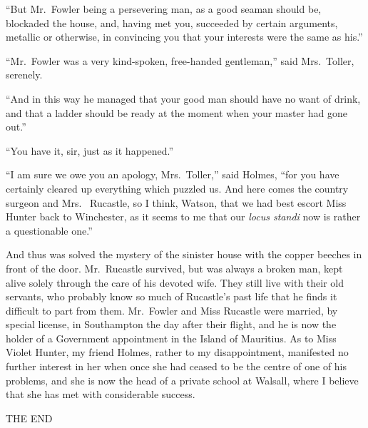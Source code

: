“But Mr.~Fowler being a persevering man, as a good
seaman should be, blockaded the house, and, having met you,
succeeded by certain arguments, metallic or otherwise, in
convincing you that your interests were the same as his.”

“Mr.~Fowler was a very kind-spoken, free-handed gentleman,”
said Mrs.~Toller, serenely.

“And in this way he managed that your good man should
have no want of drink, and that a ladder should be ready at
the moment when your master had gone out.”

“You have it, sir, just as it happened.”

“I am sure we owe you an apology, Mrs.~Toller,” said
Holmes, “for you have certainly cleared up everything which
puzzled us. And here comes the country surgeon and Mrs.\ %
Rucastle, so I think, Watson, that we had best escort Miss
Hunter back to Winchester, as it seems to me that our \textit{locus
standi} now is rather a questionable one.”

And thus was solved the mystery of the sinister house with
the copper beeches in front of the door. Mr.~Rucastle survived,
but was always a broken man, kept alive solely through
the care of his devoted wife. They still live with their old
servants, who probably know so much of Rucastle’s past life
that he finds it difficult to part from them. Mr.~Fowler and
Miss Rucastle were married, by special license, in Southampton
the day after their flight, and he is now the holder of a
Government appointment in the Island of Mauritius. As to
Miss Violet Hunter, my friend Holmes, rather to my
disappointment, manifested no further interest in her when once
she had ceased to be the centre of one of his problems, and
she is now the head of a private school at Walsall, where I
believe that she has met with considerable success.

THE END
